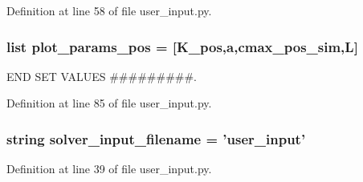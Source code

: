 Definition at line 58 of file user\-\_\-input.\-py.

\hypertarget{namespaceuser__input_a5bacef25baf63731923fbef674af4e9d}{
\subsubsection[{plot\-\_\-params\-\_\-pos}]{\setlength{\rightskip}{0pt plus 5cm}list plot\-\_\-params\-\_\-pos = \mbox{[}{\bf K\-\_\-pos},a,{\bf cmax\-\_\-pos\-\_\-sim},L\mbox{]}}}\label{namespaceuser__input_a5bacef25baf63731923fbef674af4e9d}


E\-N\-D S\-E\-T V\-A\-L\-U\-E\-S \#\#\#\#\#\#\#\#\#. 



Definition at line 85 of file user\-\_\-input.\-py.

\hypertarget{namespaceuser__input_a92a75cd7aa57960ca65957a1baa06d77}{
\subsubsection[{solver\-\_\-input\-\_\-filename}]{\setlength{\rightskip}{0pt plus 5cm}string solver\-\_\-input\-\_\-filename = 'user\-\_\-input'}}\label{namespaceuser__input_a92a75cd7aa57960ca65957a1baa06d77}


Definition at line 39 of file user\-\_\-input.\-py.

